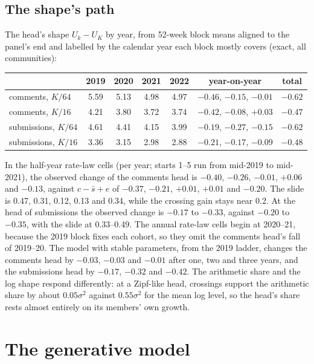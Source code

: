 \documentclass[10pt]{article}
\begin{document}
\subsection{The shape's path}
The head's shape $U_k - U_K$ by year, from 52-week block means aligned to the panel's end and labelled by the calendar year each block mostly covers (exact, all communities):
\begin{center}\small\begin{tabular}{lcccccc}
\toprule
 & 2019 & 2020 & 2021 & 2022 & year-on-year & total\\
\midrule
comments, $K/64$ & 5.59 & 5.13 & 4.98 & 4.97 & $-0.46$, $-0.15$, $-0.01$ & $-0.62$\\
comments, $K/16$ & 4.21 & 3.80 & 3.72 & 3.74 & $-0.42$, $-0.08$, $+0.03$ & $-0.47$\\
submissions, $K/64$ & 4.61 & 4.41 & 4.15 & 3.99 & $-0.19$, $-0.27$, $-0.15$ & $-0.62$\\
submissions, $K/16$ & 3.36 & 3.15 & 2.98 & 2.88 & $-0.21$, $-0.17$, $-0.09$ & $-0.48$\\
\bottomrule
\end{tabular}\end{center}
In the half-year rate-law cells (per year; starts 1--5 run from mid-2019 to mid-2021), the observed change of the comments head is $-0.40$, $-0.26$, $-0.01$, $+0.06$ and $-0.13$, against $c - \bar s + e$ of $-0.37$, $-0.21$, $+0.01$, $+0.01$ and $-0.20$. The slide is 0.47, 0.31, 0.12, 0.13 and 0.34, while the crossing gain stays near 0.2. At the head of submissions the observed change is $-0.17$ to $-0.33$, against $-0.20$ to $-0.35$, with the slide at 0.33--0.49. The annual rate-law cells begin at 2020--21, because the 2019 block fixes each cohort, so they omit the comments head's fall of 2019--20. The model with stable parameters, from the 2019 ladder, changes the comments head by $-0.03$, $-0.03$ and $-0.01$ after one, two and three years, and the submissions head by $-0.17$, $-0.32$ and $-0.42$. The arithmetic share and the log shape respond differently: at a Zipf-like head, crossings support the arithmetic share by about $0.05\sigma^2$ against $0.55\sigma^2$ for the mean log level, so the head's share rests almost entirely on its members' own growth.

\section{The generative model}
\end{document}
